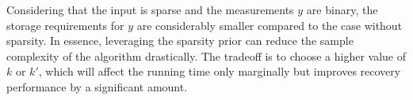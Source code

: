 Considering that the input is sparse and the measurements $y$ are binary, the storage requirements for $y$ are considerably smaller compared to the case without sparsity. In essence, leveraging the sparsity prior can reduce the sample complexity of the algorithm drastically. The tradeoff is to choose a higher value of $k$ or $k'$, which will affect the running time only marginally but improves recovery performance by a significant amount.



